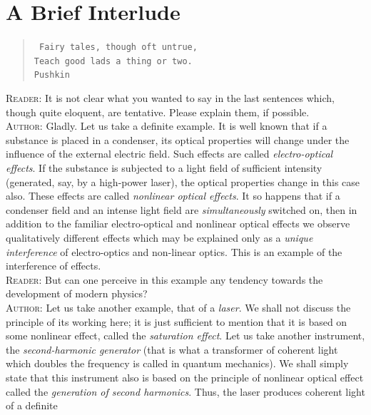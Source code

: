 \documentclass[a4paper,sfsidenotes,colorlinks=true]{tufte-book}
\numberwithin{equation}{section}
\numberwithin{figure}{section}
\begin{document}
\section*{A Brief Interlude}
\label{interlude-05}
\vspace*{10pt}
\begin{fullwidth}
\begin{verse}
\texttt{\small
Fairy tales, though oft untrue, \\
Teach good lads a thing or two.\\
Pushkin}
\end{verse}
\end{fullwidth}
\vspace*{10pt}
\textsc{Reader:} It is not clear what you wanted to say in the last
sentences which,
though quite eloquent, are tentative. Please explain them, if possible.\\
\textsc{Author:} Gladly. Let us take a definite example. It is well
known that if a substance is placed in a condenser, its optical
properties will change under the influence of the external electric
field. Such effects are called \emph{electro-optical effects}. If the
substance is subjected to a light field of sufficient intensity
(generated, say, by a high-power laser), the optical properties change
in this case also. These effects are called \emph{nonlinear optical
effects}. It so happens that if a condenser field and an intense light
field are \emph{simultaneously} switched on, then in addition to the familiar
electro-optical and nonlinear optical effects we observe qualitatively
different effects which may be explained only as a \emph{unique interference}
of electro-optics and non-linear optics. This is an example of the
interference of effects.\\
\textsc{Reader:} But can one perceive in this example any tendency towards the development of modern physics?\\
\textsc{Author:} Let us take another example, that of a \emph{laser}. We
shall not discuss the principle of its working here; it is just
sufficient to mention that it is based on some nonlinear effect,
called the \emph{saturation effect}. Let us take another instrument, the
\emph{second-harmonic generator} (that is what a transformer of coherent
light which doubles the frequency is called in quantum mechanics). We
shall simply state that this instrument also is based on the principle
of nonlinear optical effect called the \emph{generation of second
harmonics}. Thus, the laser produces coherent light of a definite
\end{document}
